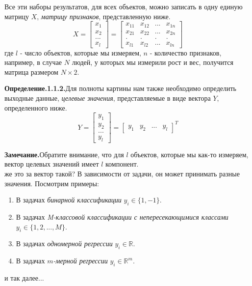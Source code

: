 \documentclass[a4paper,12pt]{article}
\begin{document}
Все эти наборы результатов, для всех объектов, можно записать в одну единую матрицу $X$, \textit{матрицу признаков}, представленную ниже.
\begin{equation*}
    X = 
    \begin{bmatrix}
        x_1\\
        x_2\\
        ...\\
        x_l
    \end{bmatrix}
    =
    \begin{bmatrix}
        x_{11} & x_{12} & ... & x_{1n} \\
        x_{21} & x_{22} & ... & x_{2n} \\
        . & . & . & .\\
        x_{l1} & x_{l2} & ... & x_{ln}
    \end{bmatrix}
\end{equation*}
где $l$ - число объектов, которые мы измеряем, $n$ - количество признаков, например, в случае $N$ людей, у которых мы измерили рост и вес, получится матрица размером $N \times2$.

\newpage
\noindent\textbf{Определение.1.1.2.}Для полноты картины нам также необходимо определить выходные данные, \textit{целевые значения}, представляемые в виде вектора $Y$, определенного ниже.
\begin{equation*}
    Y =
    \begin{bmatrix}
        y_1\\
        y_2\\
        ...\\
        y_l
    \end{bmatrix}
    =
    \begin{bmatrix}
        y_1 & y_2 & ... & y_l
    \end{bmatrix}
    ^T
\end{equation*}

\noindent\textbf{Замечание.}Обратите внимание, что для $l$ объектов, которые мы как-то измеряем, вектор целевых значений имеет $l$ компонент.\\

 же это за вектор такой? В зависимости от задачи, он может принимать разные значения. Посмотрим примеры:
\begin{enumerate}
    \item В задачах \textit{бинарной классификации} $y_i\in\{1,-1\}$.
    \item В задачах \textit{M-классовой классификации с непересекающимися классами} $y_i\in\{1,2,...,M\}$.
    \item В задачах \textit{одномерной регрессии} $y_i\in\mathds{R}$.
    \item В задачах \textit{$m$-мерной регрессии} $y_i\in\mathds{R}^m$.
\end{enumerate}
и так далее...\\
\end{document}
